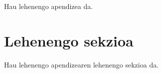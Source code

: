 
Hau lehenengo apendizea da.

\section{Lehenengo sekzioa}

Hau lehenengo apendizearen lehenengo sekzioa da.
